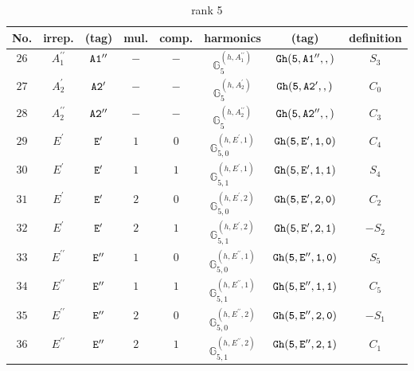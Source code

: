 \documentclass[fleqn,8pt]{jsarticle}
\begin{document}
\begin{table}[ht!]
\begin{center}
\caption{rank 5}
\renewcommand{\arraystretch}{1.3}
\begin{tabular}{cccccccc} \hline \hline
No. & irrep. & (tag) & mul. & comp. & harmonics & (tag) & definition \\ \hline
$ 26 $ & $ A_{1}^{\prime\prime} $ & $ {\tt A1''} $ & $ - $ & $ - $ & $ \mathbb{G}_{5}^{(h,A_{1}^{\prime\prime})} $ & $ {\tt Gh(5,A1'',,)} $ & $ S_{3} $ \\
$ 27 $ & $ A_{2}^{\prime} $ & $ {\tt A2'} $ & $ - $ & $ - $ & $ \mathbb{G}_{5}^{(h,A_{2}^{\prime})} $ & $ {\tt Gh(5,A2',,)} $ & $ C_{0} $ \\
$ 28 $ & $ A_{2}^{\prime\prime} $ & $ {\tt A2''} $ & $ - $ & $ - $ & $ \mathbb{G}_{5}^{(h,A_{2}^{\prime\prime})} $ & $ {\tt Gh(5,A2'',,)} $ & $ C_{3} $ \\
$ 29 $ & $ E^{\prime} $ & $ {\tt E'} $ & $ 1 $ & $ 0 $ & $ \mathbb{G}_{5,0}^{(h,E^{\prime},1)} $ & $ {\tt Gh(5,E',1,0)} $ & $ C_{4} $ \\
$ 30 $ & $ E^{\prime} $ & $ {\tt E'} $ & $ 1 $ & $ 1 $ & $ \mathbb{G}_{5,1}^{(h,E^{\prime},1)} $ & $ {\tt Gh(5,E',1,1)} $ & $ S_{4} $ \\
$ 31 $ & $ E^{\prime} $ & $ {\tt E'} $ & $ 2 $ & $ 0 $ & $ \mathbb{G}_{5,0}^{(h,E^{\prime},2)} $ & $ {\tt Gh(5,E',2,0)} $ & $ C_{2} $ \\
$ 32 $ & $ E^{\prime} $ & $ {\tt E'} $ & $ 2 $ & $ 1 $ & $ \mathbb{G}_{5,1}^{(h,E^{\prime},2)} $ & $ {\tt Gh(5,E',2,1)} $ & $ - S_{2} $ \\
$ 33 $ & $ E^{\prime\prime} $ & $ {\tt E''} $ & $ 1 $ & $ 0 $ & $ \mathbb{G}_{5,0}^{(h,E^{\prime\prime},1)} $ & $ {\tt Gh(5,E'',1,0)} $ & $ S_{5} $ \\
$ 34 $ & $ E^{\prime\prime} $ & $ {\tt E''} $ & $ 1 $ & $ 1 $ & $ \mathbb{G}_{5,1}^{(h,E^{\prime\prime},1)} $ & $ {\tt Gh(5,E'',1,1)} $ & $ C_{5} $ \\
$ 35 $ & $ E^{\prime\prime} $ & $ {\tt E''} $ & $ 2 $ & $ 0 $ & $ \mathbb{G}_{5,0}^{(h,E^{\prime\prime},2)} $ & $ {\tt Gh(5,E'',2,0)} $ & $ - S_{1} $ \\
$ 36 $ & $ E^{\prime\prime} $ & $ {\tt E''} $ & $ 2 $ & $ 1 $ & $ \mathbb{G}_{5,1}^{(h,E^{\prime\prime},2)} $ & $ {\tt Gh(5,E'',2,1)} $ & $ C_{1} $ \\
 \hline \hline
\end{tabular}
\end{center}
\end{table}
\end{document}
